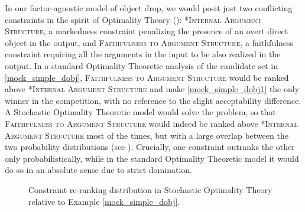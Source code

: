 In our factor-agnostic model of object drop, we would posit just two conflicting constraints in the spirit of Optimality Theory (): \textsc{*Internal Argument Structure}, a markedness constraint penalizing the presence of an overt direct object in the output, and \textsc{Faithfulness to Argument Structure}, a faithfulness constraint requiring all the arguments in the input to be also realized in the output. In a standard Optimality Theoretic analysis of the candidate set in \ref{mock_simple_dobj}, \textsc{Faithfulness to Argument Structure} would be ranked above \textsc{*Internal Argument Structure} and make \ref{mock_simple_dobj1} the only winner in the competition, with no reference to the slight acceptability difference. A Stochastic Optimality Theoretic model would solve the problem, so that \textsc{Faithfulness to Argument Structure} would indeed be ranked above \textsc{*Internal Argument Structure} most of the times, but with a large overlap between the two probability distributions (see ). Crucially, one constraint outranks the other only probabilistically, while in the standard Optimality Theoretic model it would do so in an absolute sense due to strict domination.

\begin{figure}[htb]
\caption{Constraint re-ranking distribution in Stochastic Optimality Theory relative to Example \ref{mock_simple_dobj}.}
\end{figure}


